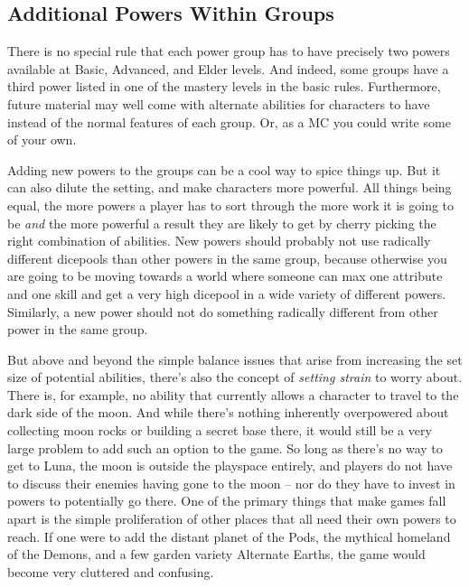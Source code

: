 \subsection{Additional Powers Within Groups}

There is no special rule that each power group has to have precisely two powers available at Basic, Advanced, and Elder levels. And indeed, some groups have a third power listed in one of the mastery levels in the basic rules. Furthermore, future material may well come with alternate abilities for characters to have instead of the normal features of each group. Or, as a MC you could write some of your own.

Adding new powers to the groups can be a cool way to spice things up. But it can also dilute the setting, and make characters more powerful. All things being equal, the more powers a player has to sort through the more work it is going to be \textit{and} the more powerful a result they are likely to get by cherry picking the right combination of abilities. New powers should probably not use radically different dicepools than other powers in the same group, because otherwise you are going to be moving towards a world where someone can max one attribute and one skill and get a very high dicepool in a wide variety of different powers. Similarly, a new power should not do something radically different from other power in the same group.

But above and beyond the simple balance issues that arise from increasing the set size of potential abilities, there's also the concept of \textit{setting strain} to worry about. There is, for example, no ability that currently allows a character to travel to the dark side of the moon. And while there's nothing inherently overpowered about collecting moon rocks or building a secret base there, it would still be a very large problem to add such an option to the game. So long as there's no way to get to Luna, the moon is outside the playspace entirely, and players do not have to discuss their enemies having gone to the moon -- nor do they have to invest in powers to potentially go there. One of the primary things that make games fall apart is the simple proliferation of other places that all need their own powers to reach. If one were to add the distant planet of the Pods, the mythical homeland of the Demons, and a few garden variety Alternate Earths, the game would become very cluttered and confusing. 

